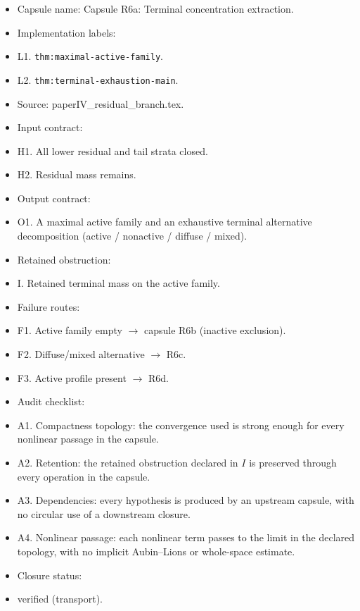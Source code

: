 \documentclass[11pt]{amsart}
\begin{document}
\begin{itemize}
  \item Capsule name: Capsule R6a: Terminal concentration extraction.
  \item Implementation labels:
  \item L1. \texttt{thm:maximal-active-family}.
  \item L2. \texttt{thm:terminal-exhaustion-main}.
  \item Source: paperIV\_residual\_branch.tex.
  \item Input contract:
  \item H1. All lower residual and tail strata closed.
  \item H2. Residual mass remains.
  \item Output contract:
  \item O1. A maximal active family and an exhaustive terminal alternative decomposition (active / nonactive / diffuse / mixed).
  \item Retained obstruction:
  \item I. Retained terminal mass on the active family.
  \item Failure routes:
  \item F1. Active family empty $\to$ capsule R6b (inactive exclusion).
  \item F2. Diffuse/mixed alternative $\to$ R6c.
  \item F3. Active profile present $\to$ R6d.
  \item Audit checklist:
  \item A1. Compactness topology: the convergence used is strong enough for every nonlinear passage in the capsule.
  \item A2. Retention: the retained obstruction declared in $I$ is preserved through every operation in the capsule.
  \item A3. Dependencies: every hypothesis is produced by an upstream capsule, with no circular use of a downstream closure.
  \item A4. Nonlinear passage: each nonlinear term passes to the limit in the declared topology, with no implicit Aubin--Lions or whole-space estimate.
  \item Closure status:
  \item verified (transport).
\end{itemize}
\end{document}
